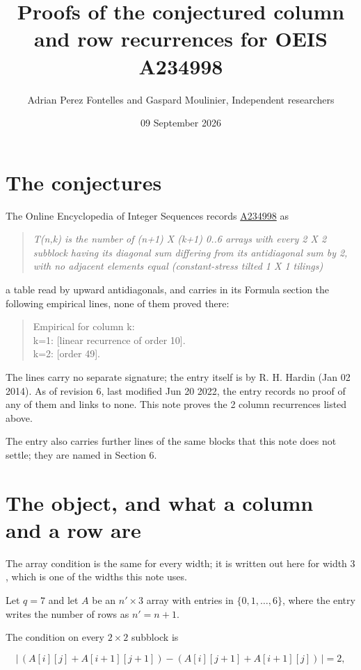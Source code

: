 \documentclass[11pt]{article}
\title{Proofs of the conjectured column and row recurrences for OEIS A234998}
\author{Adrian Perez Fontelles and Gaspard Moulinier, Independent researchers}
\date{09 September 2026}
\theoremstyle{definition}
\begin{document}
\maketitle
\section{The conjectures}

The Online Encyclopedia of Integer Sequences records \href{https://oeis.org/A234998}{A234998} as

\begin{quote}\itshape T(n,k) is the number of (n+1) X (k+1) 0..6 arrays with every 2 X 2 subblock having its diagonal sum differing from its antidiagonal sum by 2, with no adjacent elements equal (constant-stress tilted 1 X 1 tilings)\end{quote}

a table read by upward antidiagonals, and carries in its Formula section the following empirical lines, none of them proved there:

\begin{quote}\ttfamily Empirical for column k:\\
k=1: [linear recurrence of order 10].\\k=2: [order 49].\end{quote}

The lines carry no separate signature; the entry itself is by R. H. Hardin (Jan 02 2014). As of revision 6, last modified Jun 20 2022, the entry records no proof of any of them and links to none. This note proves the 2 column recurrences listed above.

The entry also carries further lines of the same blocks that this note does not settle; they are named in Section 6.

\section{The object, and what a column and a row are}

The array condition is the same for every width; it is written out here for width $3$, which is one of the widths this note uses.

Let $q = 7$ and let $A$ be an $n' \times 3$ array with entries in $\{0,1,\dots,6\}$, where the entry writes the number of rows as $n' = n + 1$.

The condition on every $2 \times 2$ subblock is

\[\bigl|\,(A[i][j] + A[i{+}1][j{+}1]) - (A[i][j{+}1] + A[i{+}1][j])\,\bigr| = 2,\]
\end{document}
